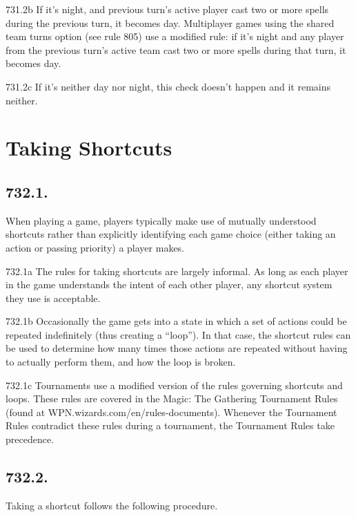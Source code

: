 731.2b If it’s night, and previous turn’s active player cast two or more spells during the previous turn, it becomes day. Multiplayer games using the shared team turns option (see rule 805) use a modified rule: if it’s night and any player from the previous turn’s active team cast two or more spells during that turn, it becomes day.

731.2c If it’s neither day nor night, this check doesn’t happen and it remains neither.

\section{Taking Shortcuts}
\subsection*{732.1.}
When playing a game, players typically make use of mutually understood shortcuts rather than explicitly identifying each game choice (either taking an action or passing priority) a player makes.

732.1a The rules for taking shortcuts are largely informal. As long as each player in the game understands the intent of each other player, any shortcut system they use is acceptable.

732.1b Occasionally the game gets into a state in which a set of actions could be repeated indefinitely (thus creating a “loop”). In that case, the shortcut rules can be used to determine how many times those actions are repeated without having to actually perform them, and how the loop is broken.

732.1c Tournaments use a modified version of the rules governing shortcuts and loops. These rules are covered in the Magic: The Gathering Tournament Rules (found at WPN.wizards.com/en/rules-documents). Whenever the Tournament Rules contradict these rules during a tournament, the Tournament Rules take precedence.

\subsection*{732.2.}
Taking a shortcut follows the following procedure.

